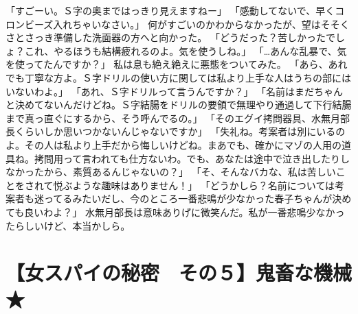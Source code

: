 「すごーい。Ｓ字の奥まではっきり見えますねー」
「感動してないで、早くコロンビーズ入れちゃいなさい。」
何がすごいのかわからなかったが、望はそそくさとさっき準備した洗面器の方へと向かった。
「どうだった？苦しかったでしょ？これ、やるほうも結構疲れるのよ。気を使うしね。」
「…あんな乱暴で、気を使ってたんですか？」
私は息も絶え絶えに悪態をついてみた。
「あら、あれでも丁寧な方よ。Ｓ字ドリルの使い方に関しては私より上手な人はうちの部にはいないわよ。」
「あれ、Ｓ字ドリルって言うんですか？」
「名前はまだちゃんと決めてないんだけどね。Ｓ字結腸をドリルの要領で無理やり通過して下行結腸まで真っ直ぐにするから、そう呼んでるの。」
「そのエグイ拷問器具、水無月部長くらいしか思いつかないんじゃないですか」
「失礼ね。考案者は別にいるのよ。その人は私より上手だから悔しいけどね。まあでも、確かにマゾの人用の道具ね。拷問用って言われても仕方ないわ。でも、あなたは途中で泣き出したりしなかったから、素質あるんじゃないの？」
「そ、そんなバカな、私は苦しいことをされて悦ぶような趣味はありません！」
「どうかしら？名前については考案者も迷ってるみたいだし、今のところ一番悲鳴が少なかった春子ちゃんが決めても良いわよ？」
水無月部長は意味ありげに微笑んだ。私が一番悲鳴少なかったらしいけど、本当かしら。


\section{【女スパイの秘密　その５】鬼畜な機械　★}

